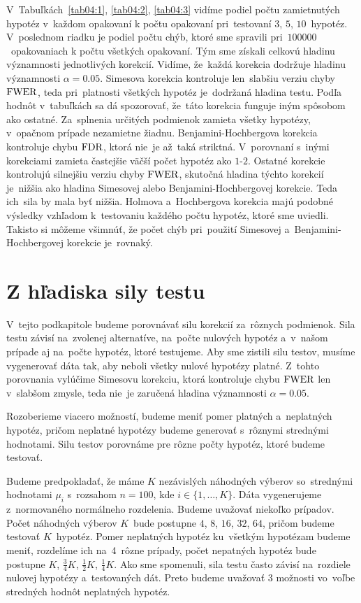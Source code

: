 V~Tabuľkách~\ref{tab04:1}, \ref{tab04:2}, \ref{tab04:3} vidíme podiel 
počtu  zamietnutých hypotéz v~každom opakovaní k počtu opakovaní 
pri~testovaní $3$, $5$, $10$~hypotéz.  
V~poslednom riadku je podiel počtu chýb, ktoré sme spravili pri~$100000$~opakovaniach 
k počtu všetkých opakovaní.  
Tým sme získali celkovú hladinu významnosti jednotlivých korekcií. 
Vidíme, že~každá korekcia dodržuje hladinu významnosti $\alpha=0.05$. 
Simesova korekcia kontroluje len~slabšiu verziu chyby ${\rm FWER}$, 
teda pri~platnosti všetkých hypotéz je~dodržaná hladina testu. 
Podľa hodnôt v~tabuľkách sa dá spozorovať, že~táto korekcia funguje iným spôsobom ako ostatné. 
Za~splnenia určitých podmienok zamieta všetky hypotézy, v~opačnom prípade nezamietne žiadnu. 
Benjamini-Hochbergova korekcia kontroluje chybu ${\rm FDR}$, ktorá nie~je až~taká striktná. 
V~porovnaní s~inými korekciami zamieta častejšie väčší počet hypotéz ako $1$-$2$. 
Ostatné korekcie kontrolujú silnejšiu verziu chyby ${\rm FWER}$, 
skutočná hladina týchto korekcií je~nižšia ako hladina Simesovej alebo Benjamini-Hochbergovej korekcie. 
Teda ich~sila by mala byť nižšia. 
Holmova a~Hochbergova korekcia majú podobné výsledky vzhľadom k~testovaniu každého počtu hypotéz, ktoré sme uviedli. 
Takisto si môžeme všimnúť, že počet chýb pri~použití Simesovej a~Benjamini-Hochbergovej korekcie je~rovnaký. 

\section{Z hľadiska sily testu}

V~tejto podkapitole budeme porovnávať silu korekcií za~rôznych podmienok. 
Sila testu závisí na~zvolenej alternatíve, na~počte nulových hypotéz 
a~v~našom prípade aj na~počte hypotéz, ktoré testujeme. 
Aby sme zistili silu testov, musíme vygenerovať dáta tak, aby neboli všetky nulové hypotézy platné. 
Z~tohto porovnania vylúčime Simesovu korekciu, 
ktorá kontroluje chybu ${\rm FWER}$ len v~slabšom zmysle, 
teda nie~je zaručená hladina významnosti $\alpha=0.05$. 

Rozoberieme viacero možností, budeme meniť pomer platných a~neplatných hypotéz, 
pričom neplatné hypotézy budeme generovať s~rôznymi strednými hodnotami. 
Silu testov porovnáme pre rôzne počty hypotéz, ktoré budeme testovať. 

Budeme predpokladať, že máme $K$ nezávislých náhodných výberov 
so~strednými hodnotami $\mu_i$ s~rozsahom $n=100$, kde $i \in \{ 1, \dots, K \}$. 
Dáta vygenerujeme z~normovaného normálneho rozdelenia. 
Budeme uvažovať niekoľko prípadov. 
Počet náhodných výberov $K$~bude postupne $4$, $8$, $16$, $32$, $64$, 
pričom budeme testovať $K$~hypotéz. 
Pomer neplatných hypotéz ku~všetkým hypotézam budeme meniť,  
rozdelíme ich na~4~rôzne prípady, 
počet nepatných hypotéz bude postupne ${K}$, $\frac{3}{4}K$, $\frac{1}{2}K$, $\frac{1}{4}K$. 
Ako sme spomenuli, sila testu často závisí na~rozdiele nulovej hypotézy a~testovaných dát. 
Preto budeme uvažovať $3$ možnosti vo~voľbe stredných hodnôt neplatných hypotéz. 

